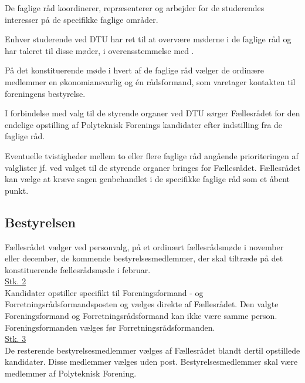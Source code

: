 \begin{list}
\item De faglige råd koordinerer, repræsenterer og arbejder for de studerendes interesser på de specifikke faglige områder.\\

\item Enhver studerende ved DTU har ret til at overvære møderne i de faglige råd og har taleret til disse møder, i overensstemmelse med .\\

\item På det konstituerende møde i hvert af de faglige råd vælger de ordinære medlemmer en økonomiansvarlig og én rådsformand, som varetager kontakten til foreningens bestyrelse.\\

\item \label{L:faglige:DTUvalg} I forbindelse med valg til de styrende organer ved DTU sørger Fællesrådet for den endelige opstilling af Polyteknisk Forenings kandidater efter indstilling fra de faglige råd.\\

\item Eventuelle tvistigheder mellem to eller flere faglige råd angående prioriteringen af valglister jf.  ved valget til de styrende organer bringes for Fællesrådet. Fællesrådet kan vælge at kræve sagen genbehandlet i de specifikke faglige råd som et åbent punkt.\\

\subsection{Bestyrelsen}
\label{L:kap:bestyrelsen}
\item \label{L:best:valg} Fællesrådet vælger ved personvalg, på et ordinært fællesrådsmøde i november eller december, de kommende bestyrelsesmedlemmer, der skal tiltræde på det konstituerende fællesrådsmøde i februar.\\

\underline{Stk. 2}\\
Kandidater opstiller specifikt til Foreningsformand - og Forretningsrådsformandsposten og vælges direkte af Fællesrådet. Den valgte Foreningsformand og Forretningsrådsformand kan ikke være samme person. Foreningsformanden vælges før Forretningsrådsformanden.\\

\underline{Stk. 3}\\
De resterende bestyrelsesmedlemmer vælges af Fællesrådet blandt dertil opstillede kandidater. Disse medlemmer vælges uden post. Bestyrelsesmedlemmer skal være medlemmer af Polyteknisk Forening.\\


\end{list}

